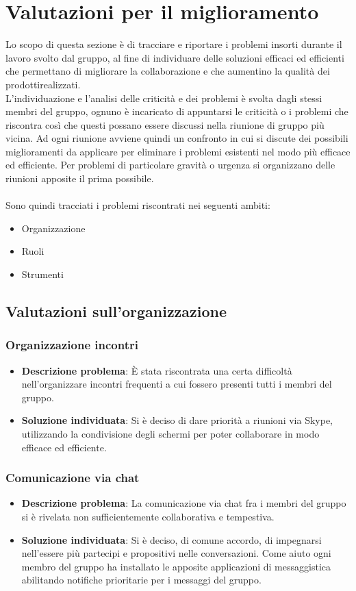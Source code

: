 \section{Valutazioni per il miglioramento} 
Lo scopo di questa sezione è di tracciare e riportare i problemi insorti durante il lavoro svolto dal gruppo, al fine di individuare delle soluzioni efficaci ed efficienti che permettano di migliorare la collaborazione e che aumentino la qualità dei prodotti\glosp realizzati.
\\L'individuazione e l'analisi delle criticità e dei problemi è svolta dagli stessi membri del gruppo, ognuno è incaricato di appuntarsi le criticità o i problemi che riscontra così che questi possano essere discussi nella riunione di gruppo più vicina. Ad ogni riunione avviene quindi un confronto in cui si discute dei possibili miglioramenti da applicare per eliminare i problemi esistenti nel modo più efficace ed efficiente. Per problemi di particolare gravità o urgenza si organizzano delle riunioni apposite il prima possibile.
\\ \\Sono quindi tracciati i problemi riscontrati nei seguenti ambiti:

\begin{itemize}
	\item Organizzazione
	\item Ruoli
	\item Strumenti
\end{itemize}

\subsection{Valutazioni sull'organizzazione}
	\subsubsection{Organizzazione incontri}
		\begin{itemize}
			\item \textbf{Descrizione problema}: È stata riscontrata una certa difficoltà nell'organizzare incontri frequenti a cui fossero presenti tutti i membri del gruppo.
			\item \textbf{Soluzione individuata}: Si è deciso di dare priorità a riunioni via Skype, utilizzando la condivisione degli schermi per poter collaborare in modo efficace ed efficiente.
		\end{itemize}
		\subsubsection{Comunicazione via chat}
			\begin{itemize}
			\item \textbf{Descrizione problema}: La comunicazione via chat fra i membri del gruppo si è rivelata non sufficientemente collaborativa e tempestiva.
			\item \textbf{Soluzione individuata}: Si è deciso, di comune accordo, di impegnarsi nell'essere più partecipi e propositivi nelle conversazioni. Come aiuto ogni membro del gruppo ha installato le apposite applicazioni di messaggistica abilitando notifiche prioritarie per i messaggi del gruppo.
			\end{itemize}
